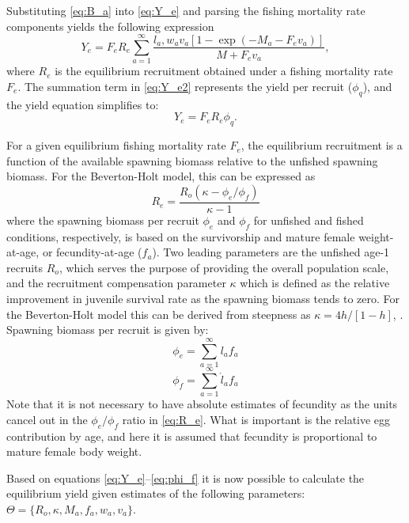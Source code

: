 Substituting \eqref{eq:B_a} into  \eqref{eq:Y_e} and parsing the fishing mortality rate components yields the following expression
\begin{equation}\label{eq:Y_e2}
	Y_e = F_e R_e \sum_{a=1}^\infty \frac{l_a,w_a v_a [1-\exp(-M_a-F_e v_a)]}{M+F_e v_a},
\end{equation}
where $R_e$ is the equilibrium recruitment obtained under a fishing mortality rate $F_e$. The summation term in \eqref{eq:Y_e2} represents the yield per recruit ($\phi_q$), and the yield equation simplifies to:
\begin{equation}\label{eq:Y_e3}
	Y_e = F_e R_e \phi_q.
\end{equation}

For a given equilibrium fishing mortality rate $F_e$, the equilibrium recruitment is a function of the available spawning biomass relative to the unfished spawning biomass. For the Beverton-Holt model, this can be expressed as
\begin{equation}\label{eq:R_e}
	R_e = \frac{R_o (\kappa-\phi_e/\phi_f)}{\kappa -1} 
\end{equation}
where the spawning biomass per recruit $\phi_e$ and $\phi_f$ for unfished and fished conditions, respectively, is based on the survivorship and mature female weight-at-age,  or fecundity-at-age ($f_a$).  Two leading parameters are the unfished age-1 recruits $R_o$, which serves the purpose of providing the overall population scale, and the recruitment compensation parameter $\kappa$ which is defined as the relative improvement in juvenile survival rate as the spawning biomass tends to zero. For the Beverton-Holt model this can be derived from steepness as $\kappa= 4h/[1-h]$, \citep[see][for further details]{Martell2008pam}.  Spawning biomass per recruit is given by:
\begin{equation}
	\phi_e = \sum_{a=1}^\infty l_a f_a\label{eq:phi_e}
\end{equation}
\begin{equation}
	\phi_f = \sum_{a=1}^\infty \acute{l}_a f_a\label{eq:phi_f}
\end{equation}
Note that it is not necessary to have absolute estimates of fecundity as the units cancel out in the $\phi_e/\phi_f$ ratio in \eqref{eq:R_e}. What is important is the relative egg contribution by age, and here it is assumed that fecundity is proportional to mature female body weight.

Based on equations \ref{eq:Y_e}--\ref{eq:phi_f} it is now possible to calculate the equilibrium yield given estimates of the following parameters: $\Theta = \{R_o, \kappa, M_a, f_a, w_a, v_a\}$.

